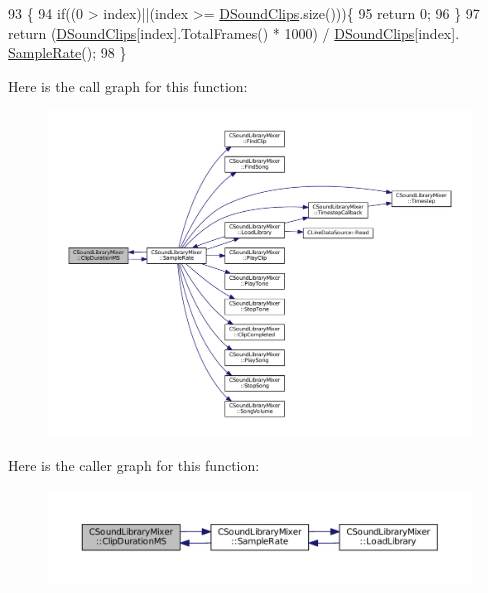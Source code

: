 \begin{DoxyCode}
93                                                \{
94     \textcolor{keywordflow}{if}((0 > index)||(index >= \hyperlink{classCSoundLibraryMixer_af4a006eacdcd590fad6e02cddaf197c2}{DSoundClips}.size()))\{
95         \textcolor{keywordflow}{return} 0;    
96     \}
97     \textcolor{keywordflow}{return} (\hyperlink{classCSoundLibraryMixer_af4a006eacdcd590fad6e02cddaf197c2}{DSoundClips}[index].TotalFrames() * 1000) / \hyperlink{classCSoundLibraryMixer_af4a006eacdcd590fad6e02cddaf197c2}{DSoundClips}[index].
      \hyperlink{classCSoundLibraryMixer_a03221f151dfe72381da5d0d0539bab94}{SampleRate}();
98 \}
\end{DoxyCode}
Here is the call graph for this function\+:\nopagebreak
\begin{figure}[H]
\begin{center}
\leavevmode
\includegraphics[width=350pt]{classCSoundLibraryMixer_a0492c587cb62cd8945880a7de3dad490_cgraph}
\end{center}
\end{figure}
Here is the caller graph for this function\+:\nopagebreak
\begin{figure}[H]
\begin{center}
\leavevmode
\includegraphics[width=350pt]{classCSoundLibraryMixer_a0492c587cb62cd8945880a7de3dad490_icgraph}
\end{center}
\end{figure}
\hypertarget{classCSoundLibraryMixer_ad8cc956bda999fe677e92f7392834b7a}{}\label{classCSoundLibraryMixer_ad8cc956bda999fe677e92f7392834b7a} 
